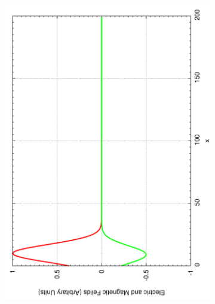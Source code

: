 \begin{figure}[ht]
        \begin{subfigure}[ht]{0.45\textwidth}
                \centering
                \includegraphics[angle=270, width=\textwidth]{initialguass3.pdf}
        \end{subfigure}
        ~
        \begin{subfigure}[ht]{0.45\textwidth}
                \centering

\end{subfigure}
\end{figure}
